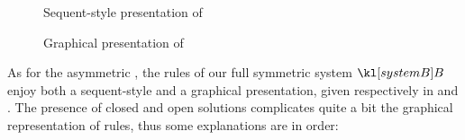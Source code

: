 %   

\begin{figure*}
  
  \caption{Sequent-style presentation of }
\end{figure*}

\begin{figure*}
  
  \caption{Graphical presentation of }
\end{figure*}

As for the asymmetric  , the rules of our full symmetric
 system $\sysB$ enjoy both a sequent-style and a graphical
presentation, given respectively in  and .
The presence of closed and open solutions complicates quite a bit the graphical
representation of rules, thus some explanations are in order:
